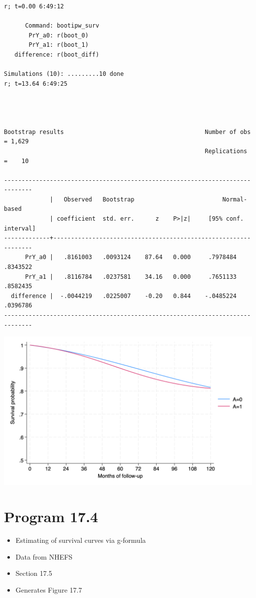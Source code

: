 \documentclass[
  10pt,
  a4paper,
]{book}
\providecommand{\tightlist}{%
  \setlength{\itemsep}{0pt}\setlength{\parskip}{0pt}}
\begin{document}
\begin{verbatim}
r; t=0.00 6:49:12

      Command: bootipw_surv
       PrY_a0: r(boot_0)
       PrY_a1: r(boot_1)
   difference: r(boot_diff)

Simulations (10): .........10 done
r; t=13.64 6:49:25




Bootstrap results                                        Number of obs = 1,629
                                                         Replications  =    10

------------------------------------------------------------------------------
             |   Observed   Bootstrap                         Normal-based
             | coefficient  std. err.      z    P>|z|     [95% conf. interval]
-------------+----------------------------------------------------------------
      PrY_a0 |   .8161003   .0093124    87.64   0.000     .7978484    .8343522
      PrY_a1 |   .8116784   .0237581    34.16   0.000     .7651133    .8582435
  difference |  -.0044219   .0225007    -0.20   0.844    -.0485224    .0396786
------------------------------------------------------------------------------
\end{verbatim}

\begin{center}\includegraphics[width=0.85\linewidth]{./figs/stata-fig-17-3} \end{center}

\section{Program 17.4}\label{program-17.4-1}

\begin{itemize}
\tightlist
\item
  Estimating of survival curves via g-formula
\item
  Data from NHEFS
\item
  Section 17.5
\item
  Generates Figure 17.7
\end{itemize}
\end{document}
